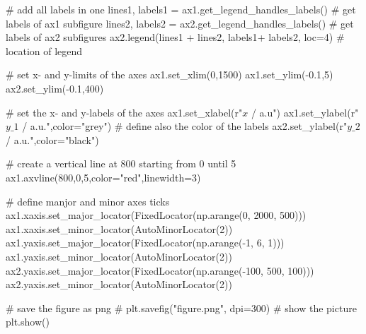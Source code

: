 \documentclass[
  letterpaper,
]{article}
\newenvironment{Shaded}{\begin{snugshade}}{\end{snugshade}}
\newcommand{\CommentTok}[1]{\textcolor[rgb]{0.37,0.37,0.37}{#1}}
\newcommand{\DecValTok}[1]{\textcolor[rgb]{0.68,0.00,0.00}{#1}}
\newcommand{\FloatTok}[1]{\textcolor[rgb]{0.68,0.00,0.00}{#1}}
\newcommand{\NormalTok}[1]{\textcolor[rgb]{0.00,0.23,0.31}{#1}}
\newcommand{\OperatorTok}[1]{\textcolor[rgb]{0.37,0.37,0.37}{#1}}
\newcommand{\StringTok}[1]{\textcolor[rgb]{0.13,0.47,0.30}{#1}}
\newcommand{\VerbatimStringTok}[1]{\textcolor[rgb]{0.13,0.47,0.30}{#1}}
\begin{document}
\begin{Shaded}
\begin{Highlighting}[]
\CommentTok{\# add all labels in one }
\NormalTok{lines1, labels1 }\OperatorTok{=}\NormalTok{ ax1.get\_legend\_handles\_labels() }\CommentTok{\# get labels of ax1 subfigure}
\NormalTok{lines2, labels2 }\OperatorTok{=}\NormalTok{ ax2.get\_legend\_handles\_labels() }\CommentTok{\# get labels of ax2 subfigures}
\NormalTok{ax2.legend(lines1 }\OperatorTok{+}\NormalTok{ lines2, labels1}\OperatorTok{+}\NormalTok{ labels2, loc}\OperatorTok{=}\DecValTok{4}\NormalTok{) }\CommentTok{\# location of legend}

\CommentTok{\# set x{-} and y{-}limits of the axes}
\NormalTok{ax1.set\_xlim(}\DecValTok{0}\NormalTok{,}\DecValTok{1500}\NormalTok{)}
\NormalTok{ax1.set\_ylim(}\OperatorTok{{-}}\FloatTok{0.1}\NormalTok{,}\DecValTok{5}\NormalTok{)}
\NormalTok{ax2.set\_ylim(}\OperatorTok{{-}}\FloatTok{0.1}\NormalTok{,}\DecValTok{400}\NormalTok{)}

\CommentTok{\# set the x{-} and y{-}labels of the axes}
\NormalTok{ax1.set\_xlabel(}\VerbatimStringTok{r"$x$ / a.u"}\NormalTok{)}
\NormalTok{ax1.set\_ylabel(}\VerbatimStringTok{r"$y\_1$ / a.u."}\NormalTok{,color}\OperatorTok{=}\StringTok{"grey"}\NormalTok{) }\CommentTok{\# define also the color of the labels}
\NormalTok{ax2.set\_ylabel(}\VerbatimStringTok{r"$y\_2$ / a.u."}\NormalTok{,color}\OperatorTok{=}\StringTok{"black"}\NormalTok{)}

\CommentTok{\# create a vertical line at 800 starting from 0 until 5}
\NormalTok{ax1.axvline(}\DecValTok{800}\NormalTok{,}\DecValTok{0}\NormalTok{,}\DecValTok{5}\NormalTok{,color}\OperatorTok{=}\StringTok{"red"}\NormalTok{,linewidth}\OperatorTok{=}\DecValTok{3}\NormalTok{)}

\CommentTok{\# define manjor and minor axes ticks}
\NormalTok{ax1.xaxis.set\_major\_locator(FixedLocator(np.arange(}\DecValTok{0}\NormalTok{, }\DecValTok{2000}\NormalTok{, }\DecValTok{500}\NormalTok{)))}
\NormalTok{ax1.xaxis.set\_minor\_locator(AutoMinorLocator(}\DecValTok{2}\NormalTok{))}
\NormalTok{ax1.yaxis.set\_major\_locator(FixedLocator(np.arange(}\OperatorTok{{-}}\DecValTok{1}\NormalTok{, }\DecValTok{6}\NormalTok{, }\DecValTok{1}\NormalTok{)))}
\NormalTok{ax1.yaxis.set\_minor\_locator(AutoMinorLocator(}\DecValTok{2}\NormalTok{))}
\NormalTok{ax2.yaxis.set\_major\_locator(FixedLocator(np.arange(}\OperatorTok{{-}}\DecValTok{100}\NormalTok{, }\DecValTok{500}\NormalTok{, }\DecValTok{100}\NormalTok{)))}
\NormalTok{ax2.yaxis.set\_minor\_locator(AutoMinorLocator(}\DecValTok{2}\NormalTok{))}

\CommentTok{\# save the figure as png}
\CommentTok{\# plt.savefig("figure.png", dpi=300)}
\CommentTok{\# show the picture}
\NormalTok{plt.show()}
\end{Highlighting}
\end{Shaded}
\end{document}
